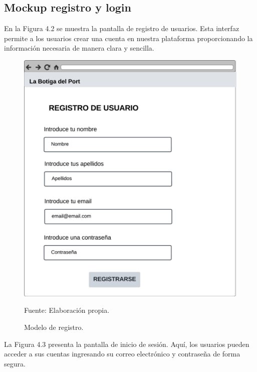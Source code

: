\subsection{Mockup registro y login}\label{subsec4.2.1}

En la Figura 4.2 se muestra la pantalla de registro de usuarios. Esta interfaz permite a los usuarios crear una cuenta en nuestra plataforma proporcionando la información necesaria de manera clara y sencilla.

\begin{figure}[H]
\begin{center}
\includegraphics[scale=0.5]{./Images/registro.png}
\caption{Modelo de registro.} Fuente: Elaboración propia.

\label{fig:fig2}

\end{center}
\end{figure}


La Figura 4.3 presenta la pantalla de inicio de sesión. Aquí, los usuarios pueden acceder a sus cuentas ingresando su correo electrónico y contraseña de forma segura.


